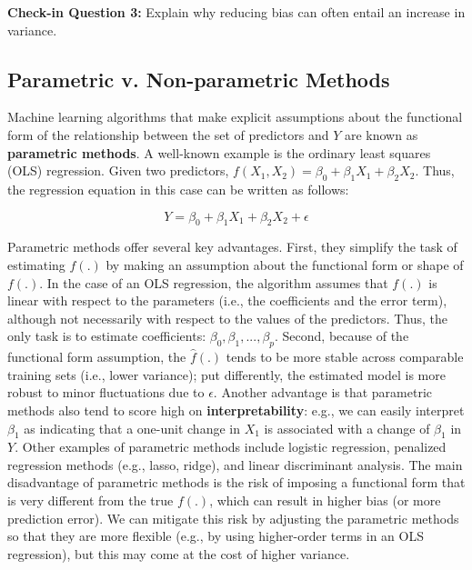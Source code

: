 \documentclass{book}
\newenvironment{shaded*}{
    \begin{center}
    \begin{tabular}{|p{0.9\textwidth}|}
    \hline\\
    }
    { 
    \\\\\hline
    \end{tabular} 
    \end{center}
}
\begin{document}
\begin{shaded*}

\textbf{Check-in Question 3:} Explain why reducing bias can often entail an
increase in variance.

\end{shaded*}

\hypertarget{parametric-v.-non-parametric-methods}{%
\subsection{Parametric v. Non-parametric
Methods}\label{parametric-v.-non-parametric-methods}}

Machine learning algorithms that make explicit assumptions about the
functional form of the relationship between the set of predictors and \(Y\)
are known as \textbf{parametric methods}. A well-known example is the ordinary
least squares (OLS) regression. Given two predictors,
\(f \left( X_{1}, X_{2} \right) = \beta _{0}+ \beta _{1}X_{1}+ \beta _{2}X_{2}\).
Thus, the regression equation in this case can be written as follows:

\[Y= \beta _{0}+ \beta _{1}X_{1}+  \beta _{2}X_{2}+ \epsilon\]

Parametric methods offer several key advantages. First, they simplify the task
of estimating \(f(.)\) by making an assumption about the functional form or
shape of \(f(.)\). In the case of an OLS regression, the algorithm assumes
that \(f(.)\) is linear with respect to the parameters (i.e., the coefficients
and the error term), although not necessarily with respect to the values of
the predictors. Thus, the only task is to estimate coefficients:
\(\beta _{0}, \beta _{1}, ..., \beta _{p}\). Second, because of the functional
form assumption, the \(\hat{f}(.)\) tends to be more stable across comparable
training sets (i.e., lower variance); put differently, the estimated model is
more robust to minor fluctuations due to \(\epsilon\). Another advantage is
that parametric methods also tend to score high on \textbf{interpretability}:
e.g., we can easily interpret \(\beta _{1}\) as indicating that a one-unit
change in \(X_{1}\) is associated with a change of \(\beta _{1}\) in \(Y\).
Other examples of parametric methods include logistic regression, penalized
regression methods (e.g., lasso, ridge), and linear discriminant analysis. The
main disadvantage of parametric methods is the risk of imposing a functional
form that is very different from the true \(f(.)\), which can result in higher
bias (or more prediction error). We can mitigate this risk by adjusting the
parametric methods so that they are more flexible (e.g., by using higher-order
terms in an OLS regression), but this may come at the cost of higher variance.
\end{document}
